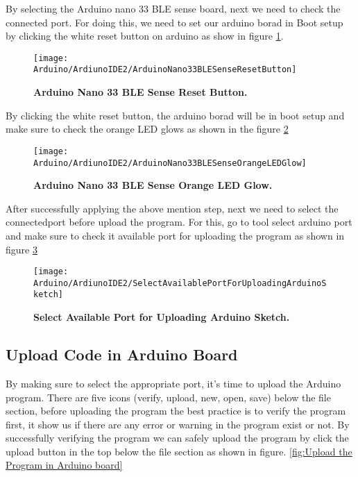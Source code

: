 By selecting the Arduino nano 33 BLE sense board, next we need to check the connected port. For doing this, we need to set our arduino borad in Boot setup by clicking the white reset button on arduino as show in figure \ref{fig:Arduino Nano 33 BLE Sense Reset Button}.

\begin{figure}[H]\centering
    \texttt{[image: Arduino/ArdiunoIDE2/ArduinoNano33BLESenseResetButton]}
    \caption{\textbf{Arduino Nano 33 BLE Sense Reset Button.}}
    \label{fig:Arduino Nano 33 BLE Sense Reset Button}		
\end{figure}

By clicking the white reset button, the arduino borad will be in boot setup and make sure to check the orange LED glows as shown in the figure \ref{fig:Arduino Nano 33 BLE Sense Orange LED Glow}

\begin{figure}[H]\centering
    \texttt{[image: Arduino/ArdiunoIDE2/ArduinoNano33BLESenseOrangeLEDGlow]}
    \caption{\textbf{Arduino Nano 33 BLE Sense Orange LED Glow.}}
    \label{fig:Arduino Nano 33 BLE Sense Orange LED Glow}		
\end{figure}

After successfully applying the above mention step, next we need to select the connectedport before upload the program. For this, go to tool select arduino port and make sure to check it available port for uploading the program as shown in figure \ref{fig:Select Available Port for Uploading Arduino Sketch}

\begin{figure}[H]\centering
    \texttt{[image: Arduino/ArdiunoIDE2/SelectAvailablePortForUploadingArduinoSketch]}
    \caption{\textbf{Select Available Port for Uploading Arduino Sketch.}}
    \label{fig:Select Available Port for Uploading Arduino Sketch}		
\end{figure}

\subsection{Upload Code in Arduino Board}\label{uploadcode}

By making sure to select the appropriate port, it’s time to upload the Arduino program. There are five icons (verify, upload, new, open, save) below the file section, before uploading the program the best practice is to verify the program first, it show us if there are any error or warning in the program exist or not. By successfully verifying
the program we can safely upload the program by click the upload button in the top below the file section as shown in figure. \ref{fig:Upload the Program in Arduino board}

